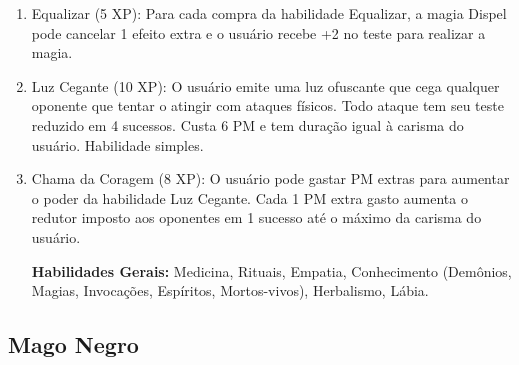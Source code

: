 \begin{enumerate}
\item Equalizar (5 XP): Para cada compra da habilidade Equalizar, a magia Dispel pode cancelar 1 efeito extra e o usuário recebe +2 no teste para realizar a magia.

	\item Luz Cegante (10 XP): O usuário emite uma luz ofuscante que cega qualquer oponente que tentar o atingir com ataques físicos. Todo ataque tem seu teste reduzido em 4 sucessos. Custa 6 PM e tem duração igual à carisma do usuário. Habilidade simples.
 
 	\item Chama da Coragem (8 XP): O usuário pode gastar PM extras para aumentar o poder da habilidade Luz Cegante. Cada 1 PM extra gasto aumenta o redutor imposto aos oponentes em 1 sucesso até o máximo da carisma do usuário.


\textbf{Habilidades Gerais:} Medicina, Rituais, Empatia, Conhecimento (Demônios, Magias, Invocações, Espíritos, Mortos-vivos), Herbalismo, Lábia.
	
\end{enumerate}

 \subsection{Mago Negro}
 
